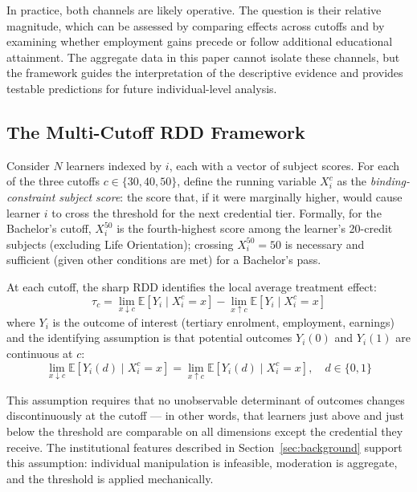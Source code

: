 \documentclass[12pt]{article}
\newcommand{\E}{\mathbb{E}}
\begin{document}
In practice, both channels are likely operative. The question is their relative magnitude, which can be assessed by comparing effects across cutoffs and by examining whether employment gains precede or follow additional educational attainment. The aggregate data in this paper cannot isolate these channels, but the framework guides the interpretation of the descriptive evidence and provides testable predictions for future individual-level analysis.

\subsection{The Multi-Cutoff RDD Framework}

Consider $N$ learners indexed by $i$, each with a vector of subject scores. For each of the three cutoffs $c \in \{30, 40, 50\}$, define the running variable $X_i^c$ as the \emph{binding-constraint subject score}: the score that, if it were marginally higher, would cause learner $i$ to cross the threshold for the next credential tier. Formally, for the Bachelor's cutoff, $X_i^{50}$ is the fourth-highest score among the learner's 20-credit subjects (excluding Life Orientation); crossing $X_i^{50} = 50$ is necessary and sufficient (given other conditions are met) for a Bachelor's pass.

At each cutoff, the sharp RDD identifies the local average treatment effect:
\begin{equation}
\tau_c = \lim_{x \downarrow c} \E[Y_i \mid X_i^c = x] - \lim_{x \uparrow c} \E[Y_i \mid X_i^c = x]
\label{eq:rdd}
\end{equation}
where $Y_i$ is the outcome of interest (tertiary enrolment, employment, earnings) and the identifying assumption is that potential outcomes $Y_i(0)$ and $Y_i(1)$ are continuous at $c$:
\begin{equation}
\lim_{x \downarrow c} \E[Y_i(d) \mid X_i^c = x] = \lim_{x \uparrow c} \E[Y_i(d) \mid X_i^c = x], \quad d \in \{0,1\}
\label{eq:continuity}
\end{equation}

This assumption requires that no unobservable determinant of outcomes changes discontinuously at the cutoff --- in other words, that learners just above and just below the threshold are comparable on all dimensions except the credential they receive. The institutional features described in Section~\ref{sec:background} support this assumption: individual manipulation is infeasible, moderation is aggregate, and the threshold is applied mechanically.
\end{document}
